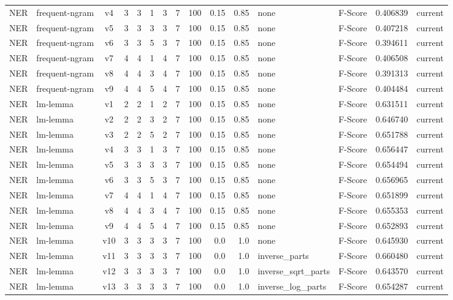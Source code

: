 \documentclass{article}
\begin{document}
\begin{xltabular}{\linewidth}{@{}lYcrrrrrrrrYlrl@{}}
NER & frequent-ngram & v4 & 3 & 3 & 1 & 3 & 7 & 100 & 0.15 & 0.85 & none & F-Score & 0.406839 & current \\
NER & frequent-ngram & v5 & 3 & 3 & 3 & 3 & 7 & 100 & 0.15 & 0.85 & none & F-Score & 0.407218 & current \\
NER & frequent-ngram & v6 & 3 & 3 & 5 & 3 & 7 & 100 & 0.15 & 0.85 & none & F-Score & 0.394611 & current \\
NER & frequent-ngram & v7 & 4 & 4 & 1 & 4 & 7 & 100 & 0.15 & 0.85 & none & F-Score & 0.406508 & current \\
NER & frequent-ngram & v8 & 4 & 4 & 3 & 4 & 7 & 100 & 0.15 & 0.85 & none & F-Score & 0.391313 & current \\
NER & frequent-ngram & v9 & 4 & 4 & 5 & 4 & 7 & 100 & 0.15 & 0.85 & none & F-Score & 0.404484 & current \\
NER & lm-lemma & v1 & 2 & 2 & 1 & 2 & 7 & 100 & 0.15 & 0.85 & none & F-Score & 0.631511 & current \\
NER & lm-lemma & v2 & 2 & 2 & 3 & 2 & 7 & 100 & 0.15 & 0.85 & none & F-Score & 0.646740 & current \\
NER & lm-lemma & v3 & 2 & 2 & 5 & 2 & 7 & 100 & 0.15 & 0.85 & none & F-Score & 0.651788 & current \\
NER & lm-lemma & v4 & 3 & 3 & 1 & 3 & 7 & 100 & 0.15 & 0.85 & none & F-Score & 0.656447 & current \\
NER & lm-lemma & v5 & 3 & 3 & 3 & 3 & 7 & 100 & 0.15 & 0.85 & none & F-Score & 0.654494 & current \\
NER & lm-lemma & v6 & 3 & 3 & 5 & 3 & 7 & 100 & 0.15 & 0.85 & none & F-Score & 0.656965 & current \\
NER & lm-lemma & v7 & 4 & 4 & 1 & 4 & 7 & 100 & 0.15 & 0.85 & none & F-Score & 0.651899 & current \\
NER & lm-lemma & v8 & 4 & 4 & 3 & 4 & 7 & 100 & 0.15 & 0.85 & none & F-Score & 0.655353 & current \\
NER & lm-lemma & v9 & 4 & 4 & 5 & 4 & 7 & 100 & 0.15 & 0.85 & none & F-Score & 0.652893 & current \\
NER & lm-lemma & v10 & 3 & 3 & 3 & 3 & 7 & 100 & 0.0 & 1.0 & none & F-Score & 0.645930 & current \\
NER & lm-lemma & v11 & 3 & 3 & 3 & 3 & 7 & 100 & 0.0 & 1.0 & inverse\_parts & F-Score & 0.660480 & current \\
NER & lm-lemma & v12 & 3 & 3 & 3 & 3 & 7 & 100 & 0.0 & 1.0 & inverse\_sqrt\_parts & F-Score & 0.643570 & current \\
NER & lm-lemma & v13 & 3 & 3 & 3 & 3 & 7 & 100 & 0.0 & 1.0 & inverse\_log\_parts & F-Score & 0.654287 & current \\

\end{xltabular}
\end{document}
